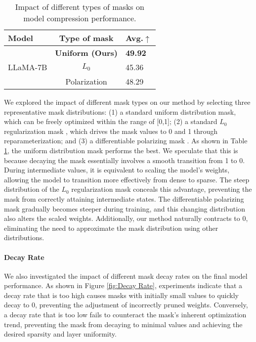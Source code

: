 \begin{table}
  \small
  \centering
  \begin{tabular}{@{}lcl@{}}
    \hline
    \textbf{Model} & \textbf{Type of mask} & \textbf{Avg.$\uparrow$} \\ 
    \hline
    & \textbf{Uniform (Ours)} & \textbf{49.92} \\
    LLaMA-7B & $L_0$ \cite{louizos2018learning} & 45.36 \\
    & Polarization \cite{guo2021gdp} & 48.29 \\
\hline
  \end{tabular}
  \caption{\label{Type of Mask}
    Impact of different types of masks on model compression performance.
  }
\end{table}

We explored the impact of different mask types on our method by selecting three representative mask distributions: (1) a standard uniform distribution mask, which can be freely optimized within the range of [0,1]; (2) a standard $L_0$ regularization mask \cite{louizos2018learning}, which drives the mask values to 0 and 1 through reparameterization; and (3) a differentiable polarizing mask \cite{guo2021gdp}. As shown in Table \ref{Type of Mask}, the uniform distribution mask performs the best. We speculate that this is because decaying the mask essentially involves a smooth transition from 1 to 0. During intermediate values, it is equivalent to scaling the model's weights, allowing the model to transition more effectively from dense to sparse. The steep distribution of the $L_0$ regularization mask conceals this advantage, preventing the mask from correctly attaining intermediate states. The differentiable polarizing mask gradually becomes steeper during training, and this changing distribution also alters the scaled weights. Additionally, our method naturally contracts to 0, eliminating the need to approximate the mask distribution using other distributions.

\paragraph{Decay Rate}

We also investigated the impact of different mask decay rates on the final model performance. As shown in Figure \ref{fig:Decay Rate}, experiments indicate that a decay rate that is too high causes masks with initially small values to quickly decay to 0, preventing the adjustment of incorrectly pruned weights. Conversely, a decay rate that is too low fails to counteract the mask's inherent optimization trend, preventing the mask from decaying to minimal values and achieving the desired sparsity and layer uniformity.

